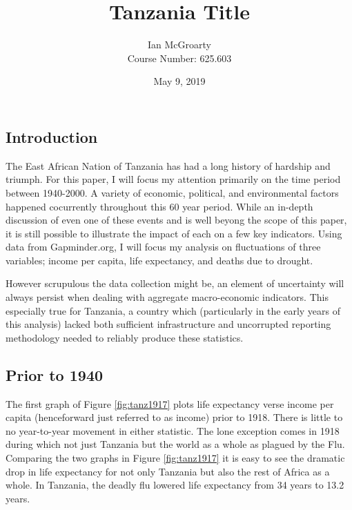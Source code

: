 \documentclass[12pt]{article}
\title{Tanzania Title}
\author{Ian McGroarty \\
	Course Number: 625.603}
\date{May 9, 2019}
\begin{document}
\maketitle
\newpage


\subsection*{Introduction} 
The East African Nation of Tanzania has had a long history of hardship and triumph. For this paper, I will focus my attention primarily on the time period between 1940-2000. A variety of economic, political, and environmental factors happened cocurrently throughout this 60 year period. While an in-depth discussion of even one of these events and is well beyong the scope of this paper, it is still possible to illustrate the impact of each on a few key indicators.  Using data from Gapminder.org, I will focus my analysis on fluctuations of three variables; income per capita, life expectancy, and deaths due to drought. 

However scrupulous the data collection might be, an element of uncertainty will always persist when dealing with aggregate macro-economic indicators. This especially true for Tanzania, a country which (particularly in the early years of this analysis) lacked both sufficient infrastructure and uncorrupted reporting methodology needed to reliably produce these statistics. 
\subsection*{Prior to 1940}
The first graph of Figure \ref{fig:tanz1917} plots life expectancy verse income per capita (henceforward just referred to as income) prior to 1918.  There is little to no year-to-year movement in either statistic. The lone exception comes in 1918 during which not just Tanzania but the world as a whole as plagued by the Flu. Comparing the two graphs in Figure \ref{fig:tanz1917}  it is easy to see the dramatic drop in life expectancy for not only Tanzania but also the rest of Africa as a whole. In Tanzania, the deadly flu lowered life expectancy from 34 years to 13.2 years. 
\end{document}
